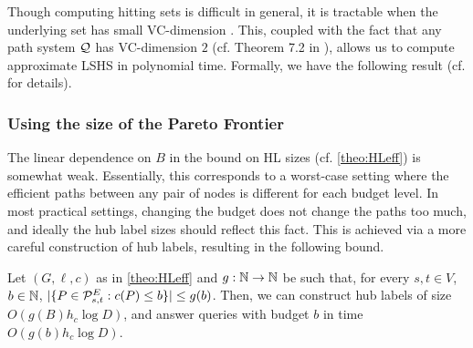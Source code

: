 Though computing hitting sets is difficult in general, it is tractable when the underlying set has small VC-dimension \cite{vc_dim_hitting}.
This, coupled with the fact that any path system $\mathcal{Q}$ has VC-dimension $2$ (cf. Theorem 7.2 in \cite{highway2013}), allows us to compute approximate LSHS in polynomial time.
Formally, we have the following result (cf. \cite{TechReport} for details).


\subsubsection{Using the size of the Pareto Frontier}
\label{sec:frontier}

The linear dependence on $B$ in the bound on HL sizes (cf. \cref{theo:HLeff}) is somewhat weak. 
Essentially, this corresponds to a worst-case setting where the efficient paths between any pair of nodes is different for each budget level. 
In most practical settings, changing the budget does not change the paths too much, and ideally the hub label sizes should reflect this fact. 
This is achieved via a more careful construction of hub labels, resulting in the following bound. 
\begin{theorem}\label{thm:markedhubs}
	Let $(G,\ell,c)$ as in \cref{theo:HLeff} and $g:\mathbb{N}\to \mathbb{N}$ be such that, for every $s,t\in V$, $b\in \mathbb{N}$, $\lvert\{P\in\mathcal{P}_{s,t}^E: c(P)\leq b\}\rvert \leq g(b)$.
	Then, we can construct hub labels of size $O(g(B)h_c\log D)$, and answer queries with budget $b$ in time $O(g(b)h_c\log D)$.
\end{theorem}


